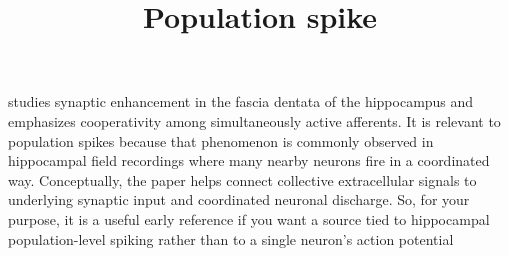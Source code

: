 \documentclass[a4paper]{article}
\title{Population spike}
\date{}
\begin{document}
    \maketitle
    
    \cite{mcnaughton-1978-synaptic-enhancement-in-fascia-dentata-cooperativity-among-coactive-afferents} studies synaptic enhancement in the fascia dentata of the hippocampus and emphasizes cooperativity among simultaneously active afferents.
    It is relevant to population spikes because that phenomenon is commonly observed in hippocampal field recordings where many nearby neurons fire in a coordinated way.
    Conceptually, the paper helps connect collective extracellular signals to underlying synaptic input and coordinated neuronal discharge.
    So, for your purpose, it is a useful early reference if you want a source tied to hippocampal population-level spiking rather than to a single neuron’s action potential
    
    
\end{document}
